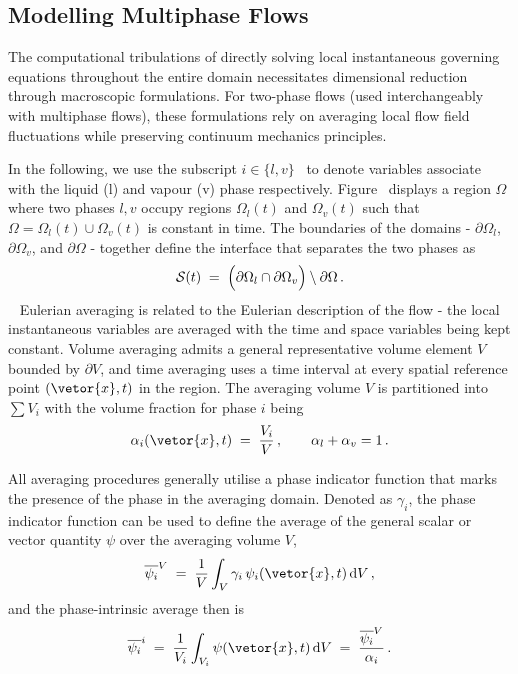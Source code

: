 \subsection{Modelling Multiphase Flows}
The computational tribulations of directly solving local instantaneous governing equations throughout 
 the entire domain necessitates dimensional reduction through macroscopic formulations. 
 For two-phase flows (used interchangeably with multiphase flows), these formulations rely 
 on averaging local flow field fluctuations while preserving continuum mechanics principles. 

In the following, we use the subscript $i \in \{l, v\}$~
 to denote variables associate with the 
 liquid (l) and vapour (v) phase respectively. Figure~ displays a region $\Omega$ where two phases $l,v$ occupy
 regions $\Omega_{l}(t)$ and $\Omega_{v}(t)$ such that $\Omega = \Omega_{l}(t) \cup \Omega_{v}(t)$ is constant in time.    
 The boundaries of the domains - $\partial \Omega_{l}$, $\partial \Omega_{v}$, and $\partial \Omega$ - together define the interface that separates the two phases as
 \begin{equation}
  \mathcal{S}(t) \;=\;\Bigl(\partial\Omega_l\cap\partial\Omega_v\Bigr)\setminus\partial\Omega\,.
  \label{eq:interface}
\end{equation}~
 Eulerian averaging is related to the Eulerian description of the flow - the local instantaneous
 variables are averaged with the time and space variables being kept constant.
 Volume averaging admits a general 
 representative volume element $V$ bounded by $\partial V$, and 
 time averaging uses a time interval at
 every spatial reference point $(\vetor{x}, t)$ in the region.
 The averaging volume $V$ is partitioned into $\textstyle \sum V_i$ with the volume fraction for phase $i$ being
\begin{equation}
  \alpha_i(\vetor{x},t) \;=\; \frac{V_i}{V}\,,\qquad
  \alpha_l + \alpha_v = 1\,.
  \label{eq:volfrac}
\end{equation}

All averaging procedures generally utilise a phase indicator function that 
 marks the presence of the phase in the averaging domain. Denoted as $\gamma_{i}$, 
 the phase indicator function can be used to define the average of the general scalar or vector quantity $\psi$ over the averaging 
 volume $V$,
\begin{equation}
  \overline{\psi_i}^V
  \;=\;
  \frac{1}{V}\int_V \gamma_i\,\psi_i(\vetor{x},t)\,\mathrm{d}V\,,
  \label{eq:volavg}
\end{equation}
and the phase-intrinsic average then is
\begin{equation}
  \overline{\psi_i}^i \;=\;\frac{1}{V_i}\int_{V_i}\psi(\vetor{x},t)\,\mathrm{d}V
  \;=\;
  \frac{\overline{\psi_i}^V}{\alpha_i}\,.
  \label{eq:intravg}
\end{equation}

